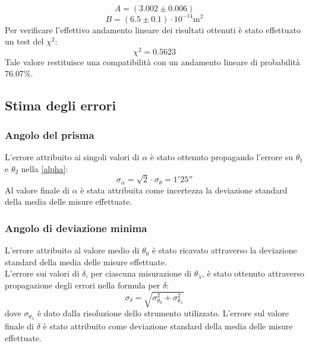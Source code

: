 \documentclass[]{article}
\let\oldsubsection\subsection%
\renewcommand{\subsection}{%
	\renewcommand{\theequation}{\thesubsection.\arabic{equation}}%
	\oldsubsection}%
\begin{document}
    \begin{equation}
        \label{A}
        A = (3.002 \pm 0.006) 
    \end{equation}
    \begin{equation}
        \label{B}
        B = (6.5 \pm 0.1) \cdot 10^{-14} \text{m}^2
    \end{equation}
    Per verificare l'effettivo andamento lineare dei risultati ottenuti è stato effettuato un test del $\chi^2$:
    \begin{equation}
        \label{chi2}
        \chi^2 = 0.5623 
    \end{equation}
    Tale valore restituisce una compatibilità con un andamento lineare di probabilità $76.07 \% $.
    
    \subsection{Stima degli errori}
    \subsubsection{Angolo del prisma}
    L'errore attribuito ai singoli valori di $\alpha$ è stato ottenuto propagando l'errore su $\theta_1$ e $\theta_2$ nella \ref{alpha}:
    \begin{equation}
        \label{alpha-err}
        \sigma_{\alpha} = \sqrt{2} \cdot \sigma_{\theta} = 1' 25'' 
    \end{equation}
    Al valore finale di $\alpha$ è stata attribuita come incertezza la deviazione standard della media delle misure effettuate.
    \label{par:alpha_err}

    \subsubsection{Angolo di deviazione minima}
    L'errore attribuito al valore medio di $\theta_0$ è stato ricavato attraverso la deviazione standard della media delle misure effettuate. \\
    L'errore sui valori di $\delta$, per ciascuna misurazione di $\theta_{\lambda}$, è stato ottenuto attraverso propagazione degli errori nella formula per $\delta$:
    \begin{equation}
        \label{delta-err-sist}
        \sigma_{\delta}= \sqrt{ \sigma_{\theta_0}^2 + \sigma_{\theta_{\lambda}}^2 } 
    \end{equation}
    dove $\sigma_{\theta_{\lambda}}$ è dato dalla risoluzione dello strumento utilizzato.
    L'errore sul valore finale di $\delta$ è stato attribuito come deviazione standard della media delle misure effettuate.
\end{document}
